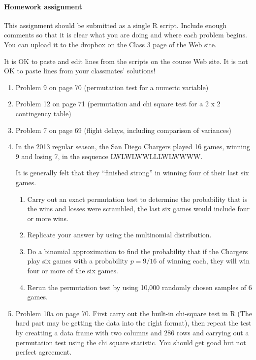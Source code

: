 \documentclass[12pt]{article}
\begin{document}
\pagebreak


\paragraph*{Homework assignment}

This assignment should be submitted as a single R script. Include enough comments so that it is clear what you are doing and where each problem begins. You can upload it to the dropbox on the Class 3 page of the Web site. 

It is OK to paste and edit lines from the scripts on the course Web site. It is not OK to paste lines from your classmates' solutions!

\begin{enumerate}




\item Problem 9 on page 70 (permutation test for a numeric variable)

\item Problem 12 on page 71 (permutation and chi square test for a 2 x 2 contingency table)

\item Problem 7 on page 69 (flight delays, including comparison of variances)

\item In the 2013 regular season, the San Diego Chargers played 16 games, winning 9 and losing 7, in the sequence LWLWLWWLLLWLWWWW.

It is generally felt that they ``finished strong'' in winning four of their last six games.
\begin{enumerate}

\item Carry out an exact permutation test to determine the probability that is the wins and losses were scrambled, the last six games would include four or more wins.
\item Replicate your answer by using the multinomial distribution.
\item Do a binomial approximation to find the probability that if the Chargers play six games with a probability $p = 9/16$ of winning each, they will win four or more of the six games. 
\item Rerun the permutation test by using 10,000 randomly chosen samples of 6 games.
\end{enumerate}

\item Problem 10a on page 70. First carry out the built-in chi-square test in R (The hard part may be getting the data into the right format), then repeat the test by creatting a data frame with two columns and 286 rows and carrying out a permutation test using the chi square statistic. You should get good but not perfect agreement.
\end{enumerate}













\pagebreak
\end{document}
